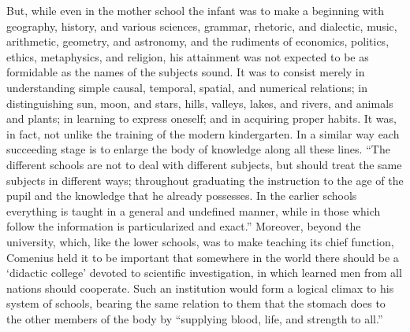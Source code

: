\documentclass[]{book}
\begin{document}
But, while even in the mother school the infant was to make a beginning with geography, history, and various sciences, grammar, rhetoric, and dialectic, music, arithmetic, geometry, and astronomy, and the rudiments of economics, politics, ethics, metaphysics, and religion, his attainment was not expected to be as formidable as the names of the subjects sound. It was to consist merely in understanding simple causal, temporal, spatial, and numerical relations; in distinguishing sun, moon, and stars, hills, valleys, lakes, and rivers, and animals and plants; in learning to express oneself; and in acquiring proper habits. It was, in fact, not unlike the training of the modern kindergarten. In a similar way each succeeding stage is to enlarge the body of knowledge along all these lines. ``The different schools are not to deal with different subjects, but should treat the same subjects in different ways; throughout graduating the instruction to the age of the pupil and the knowledge that he already possesses. In the earlier schools everything is taught in a general and undefined manner, while in those which follow the information is particularized and exact.'' Moreover, beyond the university, which, like the lower schools, was to make teaching its chief function, Comenius held it to be important that somewhere in the world there should be a `didactic college' devoted to scientific investigation, in which learned men from all nations should cooperate. Such an institution would form a logical climax to his system of schools, bearing the same relation to them that the stomach does to the other members of the body by ``supplying blood, life, and strength to all.''
\end{document}
